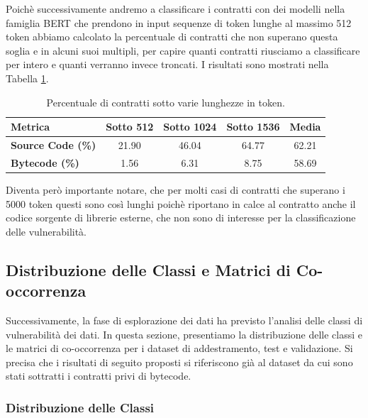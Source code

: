 \documentclass[../../Thesis.tex]{subfiles}
\begin{document}
Poich\`e successivamente andremo a classificare i contratti con dei modelli nella famiglia BERT che prendono in input sequenze di token lunghe al massimo 512 token abbiamo calcolato la percentuale di contratti che non superano questa soglia e in alcuni suoi multipli, per capire quanti contratti riusciamo a classificare per intero e quanti verranno invece troncati. I risultati sono mostrati nella Tabella \ref{tab:summary}.
\begin{table}[h!]
    \centering
    \begin{tabular}{|l|c|c|c|c|}
        \hline
        \textbf{Metrica} & \textbf{Sotto 512} & \textbf{Sotto 1024} & \textbf{Sotto 1536} & \textbf{Media} \\
        \hline
        \textbf{Source Code (\%)} & 21.90 & 46.04 & 64.77 & 62.21 \\
        \textbf{Bytecode (\%)} & 1.56 & 6.31 & 8.75 & 58.69 \\
        \hline
    \end{tabular}
    \caption{Percentuale di contratti sotto varie lunghezze in token.}
    \label{tab:summary}
\end{table}


Diventa per\`o importante notare, che per molti casi di contratti che superano i 5000 token questi sono cos\`i lunghi poich\`e riportano in calce al contratto anche il codice sorgente di librerie esterne, che non sono di interesse per la classificazione delle vulnerabilit\`a. 


\subsection{Distribuzione delle Classi e Matrici di Co-occorrenza}
Successivamente, la fase di esplorazione dei dati ha previsto l'analisi delle classi di vulnerabilit\`a dei dati. In questa sezione, presentiamo la distribuzione delle classi e le matrici di co-occorrenza per i dataset di addestramento, test e validazione. Si precisa che i risultati di seguito proposti si riferiscono gi\`a al dataset da cui sono stati sottratti i contratti privi di bytecode.

\subsubsection{Distribuzione delle Classi}
\end{document}
